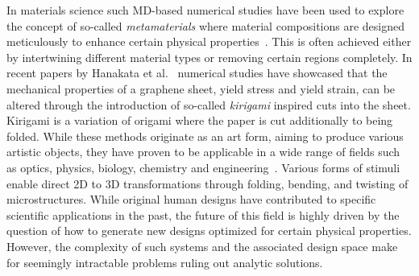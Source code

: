 In materials science such \acrshort{MD}-based numerical studies have been used
to explore the concept of so-called \textit{metamaterials} where material
compositions are designed meticulously to enhance certain physical properties~\cite{PhysRevLett.121.255304, PhysRevResearch.2.042006, graphene/hBN, Mao, Yang,
Forte}. This is often achieved either by intertwining different material types
or removing certain regions completely. In recent papers by Hanakata et al.~\cite{PhysRevLett.121.255304, PhysRevResearch.2.042006}
numerical studies have showcased that the mechanical properties of a graphene
sheet, yield stress and yield strain, can be altered through the introduction of
so-called \textit{kirigami} inspired cuts into the sheet. Kirigami is a
variation of origami where the paper is cut additionally to being folded. While
these methods originate as an art form, aiming to produce various artistic
objects, they have proven to be applicable in a wide range of fields such as
optics, physics, biology, chemistry and engineering~\cite{chen_kirigamiorigami_2020}. Various forms of stimuli enable direct 2D to
3D transformations through folding, bending, and twisting of microstructures.
While original human designs have contributed to specific scientific
applications in the past, the future of this field is highly driven by the
question of how to generate new designs optimized for certain physical
properties. However, the complexity of such systems and the associated design
space make for seemingly intractable problems ruling out analytic solutions.


